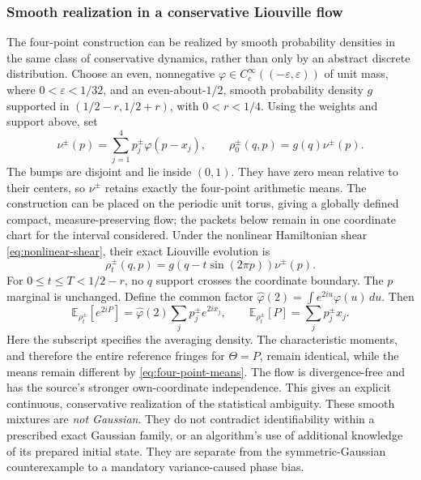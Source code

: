 \subsubsection{Smooth realization in a conservative Liouville flow}
The four-point construction can be realized by smooth probability
densities in the same class of conservative dynamics, rather than only
by an abstract discrete distribution. Choose an even, nonnegative
$\varphi\in C_c^\infty((-\varepsilon,\varepsilon))$ of unit mass,
where $0<\varepsilon<1/32$, and an even-about-$1/2$, smooth probability
density $g$ supported in $(1/2-r,1/2+r)$, with $0<r<1/4$.
Using the weights and support above, set
\begin{equation}
 \nu^\pm(p)=\sum_{j=1}^4p_j^\pm\varphi(p-x_j),\qquad
 \rho_0^\pm(q,p)=g(q)\nu^\pm(p).
 \label{eq:continuous-packets}
\end{equation}
The bumps are disjoint and lie inside $(0,1)$. They have zero mean
relative to their centers, so $\nu^\pm$ retains exactly the four-point
arithmetic means. The construction can be placed on the periodic unit
torus, giving a globally defined compact, measure-preserving flow; the
packets below remain in one coordinate chart for the interval considered.
Under the nonlinear Hamiltonian shear
\eqref{eq:nonlinear-shear}, their exact Liouville evolution is
\begin{equation}
 \rho_t^\pm(q,p)=g(q-t\sin(2\pi p))\nu^\pm(p).
 \label{eq:continuous-packet-flow}
\end{equation}
For $0\leq t\leq T<1/2-r$, no $q$ support crosses the coordinate
boundary. The $p$ marginal is unchanged. Define the common factor
$\widehat\varphi(2)=\int e^{2iu}\varphi(u)\,du$. Then
\begin{equation}
 \mathbb E_{\rho_t^\pm}[e^{2iP}]
 =\widehat\varphi(2)\sum_jp_j^\pm e^{2ix_j},\qquad
 \mathbb E_{\rho_t^\pm}[P]=\sum_jp_j^\pm x_j.
 \label{eq:continuous-fringe-and-mean}
\end{equation}
Here the subscript specifies the averaging density. The characteristic
moments, and therefore the entire reference fringes for $\Theta=P$,
remain identical, while the means remain different by
\eqref{eq:four-point-means}. The flow is divergence-free and has the
source's stronger own-coordinate independence. This gives an explicit
continuous, conservative realization of the statistical ambiguity.
These smooth mixtures are \emph{not Gaussian}. They do not contradict
identifiability within a prescribed exact Gaussian family, or an
algorithm's use of additional knowledge of its prepared initial state.
They are separate from the symmetric-Gaussian counterexample to a
mandatory variance-caused phase bias.

